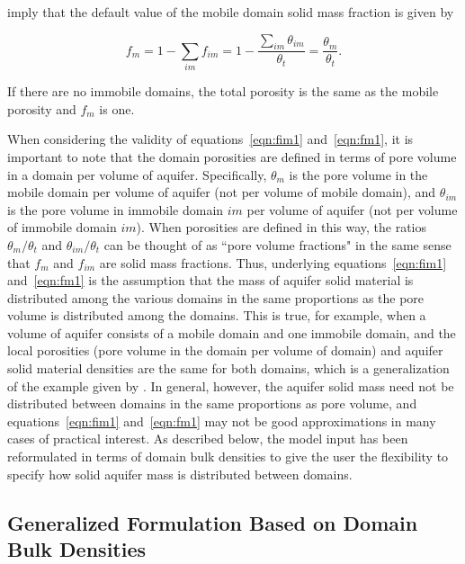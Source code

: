 \noindent imply that the default value of the mobile domain solid mass fraction is given by

\begin{equation}
\label{eqn:fm1}
f_m = 1 - \sum_{im}f_{im} = 1 - \frac{\sum_{im}\theta_{im}}{\theta_t} = \frac{\theta_m}{\theta_t}.
\end{equation}

\noindent If there are no immobile domains, the total porosity is the same as the mobile porosity and $f_m$ is one.

When considering the validity of equations~\ref{eqn:fim1} and~\ref{eqn:fm1}, it is important to note that the domain porosities are defined in terms of pore volume in a domain per volume of aquifer. Specifically, $\theta_m$ is the pore volume in the mobile domain per volume of aquifer (not per volume of mobile domain), and $\theta_{im}$ is the pore volume in immobile domain $im$ per volume of aquifer (not per volume of immobile domain $im$). When porosities are defined in this way, the ratios $\theta_m / \theta_t$ and $\theta_{im} / \theta_t$ can be thought of as ``pore volume fractions" in the same sense that $f_m$ and $f_{im}$ are solid mass fractions. Thus, underlying equations~\ref{eqn:fim1} and~\ref{eqn:fm1} is the assumption that the mass of aquifer solid material is distributed among the various domains in the same proportions as the pore volume is distributed among the domains. This is true, for example, when a volume of aquifer consists of a mobile domain and one immobile domain, and the local porosities (pore volume in the domain per volume of domain) and aquifer solid material densities are the same for both domains, which is a generalization of the example given by \cite{modflow6gwt}. In general, however, the aquifer solid mass need not be distributed between domains in the same proportions as pore volume, and equations~\ref{eqn:fim1} and~\ref{eqn:fm1} may not be good approximations in many cases of practical interest. As described below, the model input has been reformulated in terms of domain bulk densities to give the user the flexibility to specify how solid aquifer mass is distributed between domains.

\subsection{Generalized Formulation Based on Domain Bulk Densities} \label{sec:solidmassfrac2b}

